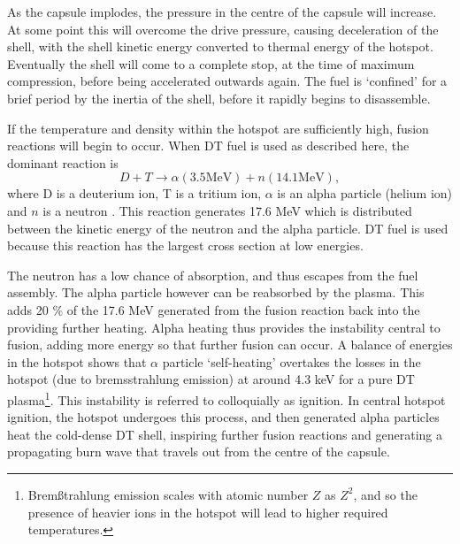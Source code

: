 As the capsule implodes, the pressure in the centre of the capsule will increase. At some point this will overcome the drive pressure, causing deceleration of the shell, with the shell kinetic energy converted to thermal energy of the hotspot. Eventually the shell will come to a complete stop, at the time of maximum compression, before being accelerated outwards again. The fuel is `confined' for a brief period by the inertia of the shell, before it rapidly begins to disassemble.

If the temperature and density within the hotspot are sufficiently high, fusion reactions will begin to occur. When DT fuel is used as described here, the dominant reaction is 
\begin{equation} D + T \rightarrow \alpha(3.5 \text{MeV}) + n(14.1 \text{MeV}), \end{equation}
where D is a deuterium ion, T is a tritium ion, $\alpha$ is an alpha particle (helium ion) and $n$ is a neutron \cite{Atzeni2008}. This reaction generates 17.6 MeV which is distributed between the kinetic energy of the neutron and the alpha particle. DT fuel is used because this reaction has the largest cross section at low energies.

The neutron has a low chance of absorption, and thus escapes from the fuel assembly. The alpha particle however can be reabsorbed by the plasma. This adds 20 \% of the 17.6 MeV generated from the fusion reaction back into the providing further heating. Alpha heating thus provides the instability central to fusion, adding more energy so that further fusion can occur. A balance of energies in the hotspot shows that $\alpha$ particle `self-heating' overtakes the losses in the hotspot (due to bremsstrahlung emission) at around 4.3 keV for a pure DT plasma\footnote{Brem{\ss}trahlung emission scales with atomic number $Z$ as $Z^2$, and so the presence of heavier ions in the hotspot will lead to higher required temperatures.}. This instability is referred to colloquially as ignition. In central hotspot ignition, the hotspot undergoes this process, and then generated alpha particles heat the cold-dense DT shell, inspiring further fusion reactions and generating a propagating burn wave that travels out from the centre of the capsule.

